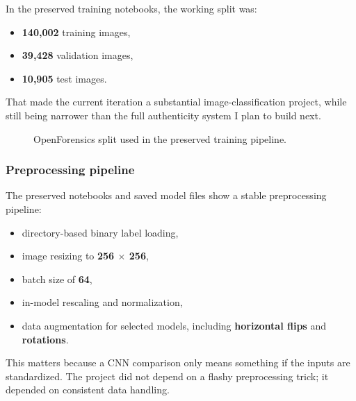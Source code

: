 \documentclass[11pt]{article}
\begin{document}
In the preserved training notebooks, the working split was:
\begin{itemize}[leftmargin=1.5em]
    \item \textbf{140,002} training images,
    \item \textbf{39,428} validation images,
    \item \textbf{10,905} test images.
\end{itemize}

That made the current iteration a substantial image-classification project, while still being narrower than the full authenticity system I plan to build next.

\begin{figure}[H]
\centering
{}
\caption{OpenForensics split used in the preserved training pipeline.}
\label{fig:data-split}
\end{figure}

\subsubsection{Preprocessing pipeline}
The preserved notebooks and saved model files show a stable preprocessing pipeline:
\begin{itemize}[leftmargin=1.5em]
    \item directory-based binary label loading,
    \item image resizing to \textbf{256 $\times$ 256},
    \item batch size of \textbf{64},
    \item in-model rescaling and normalization,
    \item data augmentation for selected models, including \textbf{horizontal flips} and \textbf{rotations}.
\end{itemize}

This matters because a CNN comparison only means something if the inputs are standardized. The project did not depend on a flashy preprocessing trick; it depended on consistent data handling.
\end{document}
